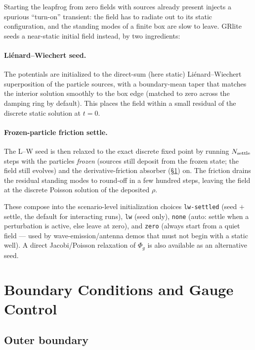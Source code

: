 \documentclass[11pt]{article}
\newcommand{\Phig}{\Phi_g}                 %
\begin{document}
Starting the leapfrog from zero fields with sources already present injects a
spurious ``turn-on'' transient: the field has to radiate out to its static
configuration, and the standing modes of a finite box are slow to leave. GRlite
seeds a near-static initial field instead, by two ingredients:

\paragraph{Liénard--Wiechert seed.} The potentials are initialized to the
direct-sum (here static) Liénard--Wiechert superposition of the particle
sources, with a boundary-mean taper that matches the interior solution smoothly
to the box edge (matched to zero across the damping ring by default). This places
the field within a small residual of the discrete static solution at $t=0$.

\paragraph{Frozen-particle friction settle.} The L--W seed is then relaxed to the
exact discrete fixed point by running $N_{\rm settle}$ steps with the particles
\emph{frozen} (sources still deposit from the frozen state; the field still
evolves) and the derivative-friction absorber (\S\ref{sec:boundary}) on. The
friction drains the residual standing modes to round-off in a few hundred steps,
leaving the field at the discrete Poisson solution of the deposited $\rho$.

These compose into the scenario-level initialization choices
\texttt{lw-settled} (seed $+$ settle, the default for interacting runs),
\texttt{lw} (seed only), \texttt{none} (auto: settle when a perturbation is
active, else leave at zero), and \texttt{zero} (always start from a quiet field
--- used by wave-emission/antenna demos that must not begin with a static well).
A direct Jacobi/Poisson relaxation of $\Phig$ is also available as an
alternative seed.

\section{Boundary Conditions and Gauge Control}
\label{sec:boundary}

\subsection{Outer boundary}
\end{document}
